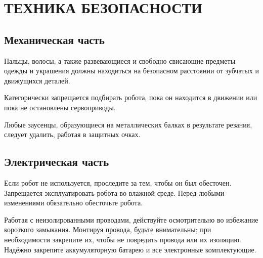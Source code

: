 \chapter{ТЕХНИКА БЕЗОПАСНОСТИ}

\section{Механическая часть}
Пальцы, волосы, а также развевающиеся и свободно свисающие
предметы одежды и украшения должны находиться на безопасном
расстоянии от зубчатых и движущихся деталей.

Категорически запрещается подбирать робота, пока он находится
в движении или пока не остановлены сервоприводы.

Любые заусенцы, образующиеся на металлических балках в результате
резания, следует удалить, работая в защитных очках.


\section{Электрическая часть}
Если робот не используется, проследите за тем, чтобы он был обесточен.
Запрещается эксплуатировать робота во влажной среде.
Перед любыми изменениями обязательно обесточьте робота.

Работая с неизолированными проводами, действуйте осмотрительно
во избежание короткого замыкания.
Монтируя провода, будьте внимательны; при необходимости закрепите
их, чтобы не повредить провода или их изоляцию.
Надёжно закрепите аккумуляторную батарею и все электронные комплектующие.